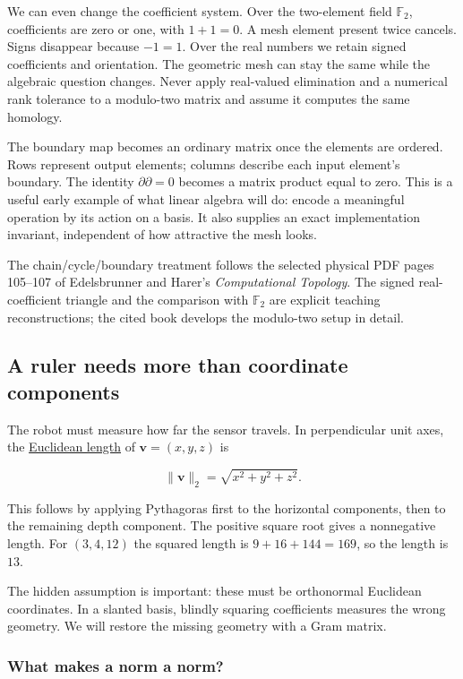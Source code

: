 We can even change the coefficient system. Over the two-element field \(\mathbb F_2\), coefficients are zero or one, with \(1+1=0\). A mesh element present twice cancels. Signs disappear because \(-1=1\). Over the real numbers we retain signed coefficients and orientation. The geometric mesh can stay the same while the algebraic question changes. Never apply real-valued elimination and a numerical rank tolerance to a modulo-two matrix and assume it computes the same homology.

The boundary map becomes an ordinary matrix once the elements are ordered. Rows represent output elements; columns describe each input element's boundary. The identity \(\partial\partial=0\) becomes a matrix product equal to zero. This is a useful early example of what linear algebra will do: encode a meaningful operation by its action on a basis. It also supplies an exact implementation invariant, independent of how attractive the mesh looks.

The chain/cycle/boundary treatment follows the selected physical PDF pages 105--107 of Edelsbrunner and Harer's \emph{Computational Topology}. The signed real-coefficient triangle and the comparison with \(\mathbb F_2\) are explicit teaching reconstructions; the cited book develops the modulo-two setup in detail.

\subsection{A ruler needs more than coordinate components}\label{01-foundations-i-ch017-a-ruler-needs-more-than-coordinate-components}

The robot must measure how far the sensor travels. In perpendicular unit axes, the \hyperref[01-foundations-i-ch017-a-ruler-needs-more-than-coordinate-components]{Euclidean length} of \(\mathbf v=(x,y,z)\) is

\[
\|\mathbf v\|_2=\sqrt{x^2+y^2+z^2}.
\]

This follows by applying Pythagoras first to the horizontal components, then to the remaining depth component. The positive square root gives a nonnegative length. For \((3,4,12)\) the squared length is \(9+16+144=169\), so the length is \(13\).

The hidden assumption is important: these must be orthonormal Euclidean coordinates. In a slanted basis, blindly squaring coefficients measures the wrong geometry. We will restore the missing geometry with a Gram matrix.

\subsubsection{What makes a norm a norm?}\label{01-foundations-i-ch017-what-makes-a-norm-a-norm}

